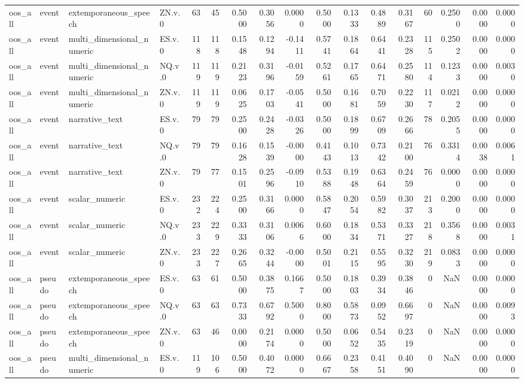 \begin{tabular}{llllrrrrrrrrrrrrr}
oos_all & event & extemporaneous_speech & ZN.v.0 & 63 & 45 & 0.5000 & 0.3056 & 0.0000 & 0.5000 & 0.1333 & 0.4889 & 0.3167 & 60 & 0.2500 & 0.0000 & 0.0000 \\
oos_all & event & multi_dimensional_numeric & ES.v.0 & 118 & 118 & 0.1548 & 0.1294 & -0.1411 & 0.5741 & 0.1864 & 0.6441 & 0.2328 & 115 & 0.2502 & 0.0000 & 0.0000 \\
oos_all & event & multi_dimensional_numeric & NQ.v.0 & 119 & 119 & 0.2123 & 0.3196 & -0.0159 & 0.5261 & 0.1765 & 0.6471 & 0.2580 & 114 & 0.1233 & 0.0000 & 0.0030 \\
oos_all & event & multi_dimensional_numeric & ZN.v.0 & 119 & 119 & 0.0625 & 0.1703 & -0.0541 & 0.5000 & 0.1681 & 0.7059 & 0.2230 & 117 & 0.0212 & 0.0000 & 0.0000 \\
oos_all & event & narrative_text & ES.v.0 & 79 & 79 & 0.2500 & 0.2428 & -0.0326 & 0.5000 & 0.1899 & 0.6709 & 0.2666 & 78 & 0.2055 & 0.0000 & 0.0000 \\
oos_all & event & narrative_text & NQ.v.0 & 79 & 79 & 0.1628 & 0.1539 & -0.0000 & 0.4143 & 0.1013 & 0.7342 & 0.2100 & 76 & 0.3314 & 0.0038 & 0.0061 \\
oos_all & event & narrative_text & ZN.v.0 & 79 & 77 & 0.1501 & 0.2596 & -0.0910 & 0.5388 & 0.1948 & 0.6364 & 0.2459 & 76 & 0.0000 & 0.0000 & 0.0000 \\
oos_all & event & scalar_numeric & ES.v.0 & 232 & 224 & 0.2500 & 0.3166 & 0.0000 & 0.5847 & 0.2054 & 0.5982 & 0.3037 & 213 & 0.2000 & 0.0000 & 0.0000 \\
oos_all & event & scalar_numeric & NQ.v.0 & 233 & 229 & 0.3333 & 0.3106 & 0.0066 & 0.6000 & 0.1834 & 0.5371 & 0.3327 & 218 & 0.3568 & 0.0000 & 0.0031 \\
oos_all & event & scalar_numeric & ZN.v.0 & 233 & 227 & 0.2665 & 0.3244 & -0.0000 & 0.5001 & 0.2115 & 0.5595 & 0.3230 & 219 & 0.0833 & 0.0000 & 0.0000 \\
oos_all & pseudo & extemporaneous_speech & ES.v.0 & 63 & 61 & 0.5000 & 0.3875 & 0.1667 & 0.5000 & 0.1803 & 0.3934 & 0.3846 & 0 & NaN & 0.0000 & 0.0000 \\
oos_all & pseudo & extemporaneous_speech & NQ.v.0 & 63 & 63 & 0.7333 & 0.6792 & 0.5000 & 0.8000 & 0.5873 & 0.0952 & 0.6697 & 0 & NaN & 0.0000 & 0.0093 \\
oos_all & pseudo & extemporaneous_speech & ZN.v.0 & 63 & 46 & 0.0000 & 0.2174 & 0.0000 & 0.5000 & 0.0652 & 0.5435 & 0.2319 & 0 & NaN & 0.0000 & 0.0000 \\
oos_all & pseudo & multi_dimensional_numeric & ES.v.0 & 119 & 106 & 0.5000 & 0.4072 & 0.0000 & 0.6667 & 0.2358 & 0.4151 & 0.4090 & 0 & NaN & 0.0000 & 0.0000 \\

\end{tabular}

